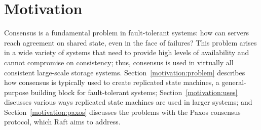 \chapter{Motivation}
\label{motivation}

Consensus is a fundamental problem in fault-tolerant systems: how can
servers reach agreement on shared state, even in the face of failures?
This problem arises in a wide variety of systems that need to provide
high levels of availability and cannot compromise on consistency; thus,
consensus is used in virtually all consistent large-scale storage
systems. Section~\ref{motivation:problem} describes how consensus is
typically used to create replicated state machines, a general-purpose
building block for fault-tolerant systems; Section~\ref{motivation:uses}
discusses various ways replicated state machines are used in larger
systems; and Section~\ref{motivation:paxos} discusses the problems with
the Paxos consensus protocol, which Raft aims to address.




